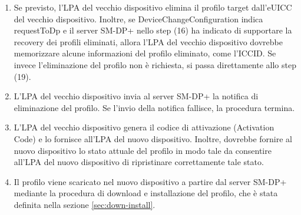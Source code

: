 \documentclass[10pt, oneside]{book}
\begin{document}
\begin{enumerate}
\item Se previsto, l'LPA del vecchio dispositivo elimina il profilo target dall'eUICC del vecchio dispositivo. Inoltre, se DeviceChangeConfiguration indica requestToDp e il server SM-DP+ nello step (16) ha indicato di supportare la recovery dei profili eliminati, allora l'LPA del vecchio dispositivo dovrebbe memorizzare alcune informazioni del profilo eliminato, come l'ICCID. Se invece l'eliminazione del profilo non è richiesta, si passa direttamente allo step (19).
\item L'LPA del vecchio dispositivo invia al server SM-DP+ la notifica di eliminazione del profilo. Se l'invio della notifica fallisce, la procedura termina.
\item L'LPA del vecchio dispositivo genera il codice di attivazione (Activation Code) e lo fornisce all'LPA del nuovo dispositivo. Inoltre, dovrebbe fornire al nuovo dispositivo lo stato attuale del profilo in modo tale da consentire all'LPA del nuovo dispositivo di ripristinare correttamente tale stato.
\item Il profilo viene scaricato nel nuovo dispositivo a partire dal server SM-DP+ mediante la procedura di download e installazione del profilo, che è stata definita nella sezione \ref{sec:down-install}.
\end{enumerate}
\end{document}
